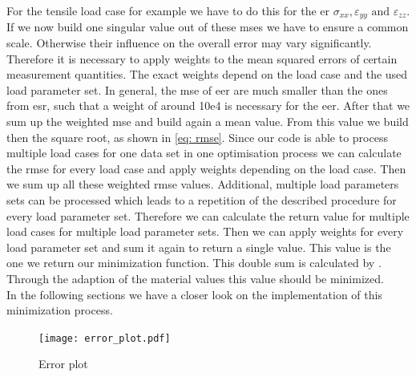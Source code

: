     
    For the tensile load case for example we have to do this for the \acrlong{er} $\sigma_{xx}, \varepsilon_{yy} \text{ and } \varepsilon_{zz}$. 
    If we now build one singular value out of these \acrshort{mse}s we have to ensure a common scale. Otherwise their influence on the overall error may vary significantly. Therefore it is necessary to apply weights to the mean squared errors of certain measurement quantities. The exact weights depend on the load case and the used load parameter set. In general, the \acrshort{mse} of \acrfull{eer} are much smaller than the ones from \acrfull{esr}, such that a weight of around 10e4 is necessary for the \acrshort{eer}. After that we sum up the weighted \acrshort{mse} and build again a mean value. From this value we build then the square root, as shown in \autoref{eq: rmse}. Since our code is able to process multiple load cases for one data set in one optimisation process we can calculate the \acrshort{rmse} for every load case and apply weights depending on the load case. Then we sum up all these weighted \acrshort{rmse} values. Additional, multiple load parameters sets can be processed which leads to a repetition of the described procedure for every load parameter set. Therefore we can calculate the return value for multiple load cases for multiple load parameter sets. Then we can apply weights for every load parameter set and sum it again to return a single value. This value is the one we return our minimization function. This double sum is calculated by . Through the adaption of the material values this value should be minimized. \\
    In the following sections we have a closer look on the implementation of this minimization process. 

    \begin{figure}[H]
        \centering
        \texttt{[image: error\_plot.pdf]}
        \caption{Error plot}
        \label{fig: erroPlot}
    \end{figure}


